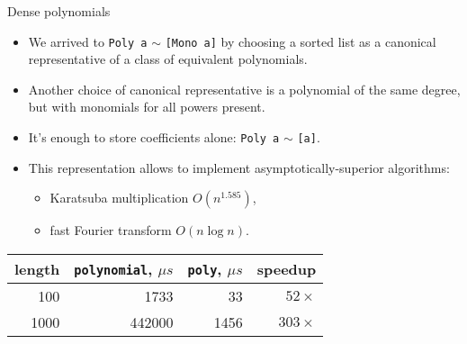 \documentclass[handout]{beamer}
\begin{document}
\begin{frame}{Dense polynomials}

\begin{itemize}[<+->]

\item We arrived to {\tt Poly a} $\sim$ {\tt [Mono a]}
      by choosing a sorted list
      as a canonical representative of a class
      of equivalent polynomials.
\item Another choice of canonical representative
      is a polynomial of the same degree, but
      with monomials for all powers present.
\item It's enough to store coefficients alone:
      {\tt Poly a} $\sim$ {\tt [a]}.
\item This representation allows to implement
      asymptotically-superior algorithms:
      \begin{itemize}
      \item Karatsuba multiplication $O(n^{1.585})$,
      \item fast Fourier transform $O(n\log n)$.
      \end{itemize}
\end{itemize}

\pause

\begin{table}
\begin{tabular}{rrrr}
length & {\tt polynomial}, $\mu s$ & {\tt poly}, $\mu s$ & speedup
\\\hline
100 & 1733 & 33 & $52\times$
\\
1000 & 442000 & 1456 & $303\times$
\end{tabular}
\end{table}

\end{frame}
\end{document}
